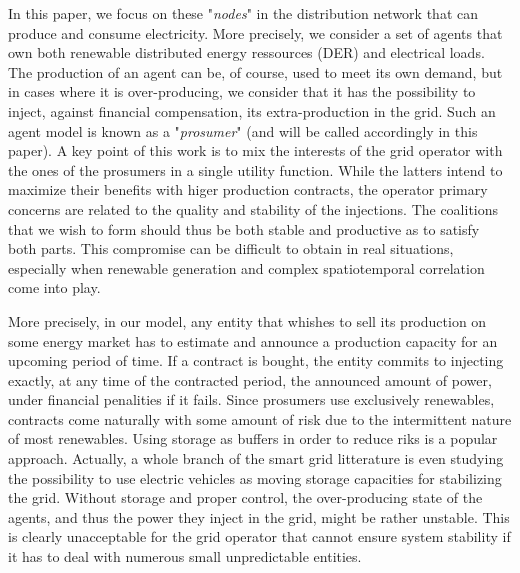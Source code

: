 \documentclass[conference]{IEEEtran}
\begin{document}

In this paper, we focus on these "\textit{nodes}" in the distribution network that can produce and consume electricity. More precisely, we consider a set of agents that own both renewable distributed energy ressources (DER) and electrical loads. The production of an agent can be, of course, used to meet its own demand, but in cases where it is over-producing, we consider that it has the possibility to inject, against financial compensation, its extra-production in the grid. Such an agent model is known as a "\textit{prosumer}" \cite{Rathnayaka2012} (and will be called accordingly in this paper). A key point of this work is to mix the interests of the grid operator with the ones of the prosumers in a single utility function. While the latters intend to maximize their benefits with higer production contracts, the operator primary concerns are related to the quality and stability of the injections. The coalitions that we wish to form should thus be both stable and productive as to satisfy both parts. This compromise can be difficult to obtain in real situations, especially when renewable generation and complex spatiotemporal correlation come into play.

More precisely, in our model, any entity that whishes to sell its production on some energy market has to estimate and announce a production capacity for an upcoming period of time. If a contract is bought, the entity commits to injecting exactly, at any time of the contracted period, the announced amount of power, under financial penalities if it fails. Since prosumers use exclusively renewables, contracts come naturally with some amount of risk due to the intermittent nature of most renewables. Using storage as buffers in order to reduce riks is a popular approach. Actually, a whole branch of the smart grid litterature is even studying the possibility to use electric vehicles as moving storage capacities for stabilizing the grid. Without storage and proper control, the over-producing state of the agents, and thus the power they inject in the grid, might be rather unstable. This is clearly unacceptable for the grid operator that cannot ensure system stability if it has to deal with numerous small unpredictable entities.
\end{document}
